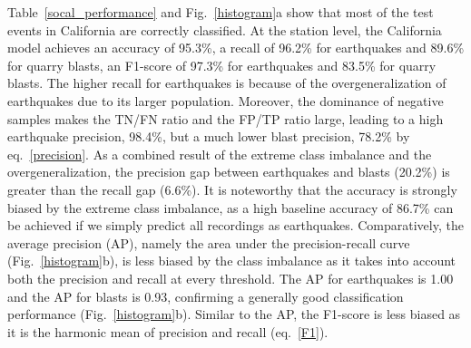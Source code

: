 \documentclass{gji}
\begin{document}
Table~\ref{socal_performance} and Fig.~\ref{histogram}a show that most of the test events in California are correctly classified. At the station level, the California model achieves an accuracy of 95.3\%, a recall of 96.2\% for earthquakes and 89.6\% for quarry blasts, an F1-score of 97.3\% for earthquakes and 83.5\% for quarry blasts. The higher recall for earthquakes is because of the overgeneralization \citep{overgeneralization} of earthquakes due to its larger population. Moreover, the dominance of negative samples makes the TN/FN ratio and the FP/TP ratio large, leading to a high earthquake precision, 98.4\%, but a much lower blast precision, 78.2\% by eq.~\ref{precision}. As a combined result of the extreme class imbalance and the overgeneralization, the precision gap between earthquakes and blasts (20.2\%) is greater than the recall gap (6.6\%). It is noteworthy that the accuracy is strongly biased by the extreme class imbalance, as a high baseline accuracy of 86.7\% can be achieved if we simply predict all recordings as earthquakes. Comparatively, the average precision (AP), namely the area under the precision-recall curve (Fig.~\ref{histogram}b), is less biased by the class imbalance as it takes into account both the precision and recall at every threshold. The AP for earthquakes is 1.00 and the AP for blasts is 0.93, confirming a generally good classification performance (Fig.~\ref{histogram}b). Similar to the AP, the F1-score is less biased as it is the harmonic mean of precision and recall (eq.~\ref{F1}).
\end{document}

